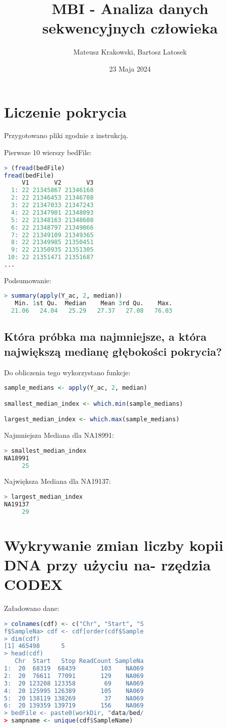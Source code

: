 \documentclass{article}
\title{MBI - Analiza danych sekwencyjnych człowieka}
\author{Mateusz Krakowski, Bartosz Latosek}
\date{23 Maja 2024}
\begin{document}
\maketitle

\section{Liczenie pokrycia}
Przygotowano pliki zgodnie z instrukcją.

Pierwsze 10 wierszy bedFile:
\begin{lstlisting}[language=R]
> (fread(bedFile)
fread(bedFile) 
     V1       V2       V3
  1: 22 21345867 21346168
  2: 22 21346453 21346708
  3: 22 21347033 21347243
  4: 22 21347901 21348093
  5: 22 21348163 21348608
  6: 22 21348797 21349066
  7: 22 21349109 21349365
  8: 22 21349985 21350451
  9: 22 21350935 21351305
 10: 22 21351471 21351687
...
\end{lstlisting}
Podsumowanie:
\begin{lstlisting}[language=R]
> summary(apply(Y_ac, 2, median))
   Min. 1st Qu.  Median    Mean 3rd Qu.    Max.
  21.06   24.04   25.29   27.37   27.08   76.03
\end{lstlisting}



\subsection{Która próbka ma najmniejsze, a która największą medianę głębokości pokrycia?}
Do obliczenia tego wykorzystano funkcje:
\begin{lstlisting}[language=R]
sample_medians <- apply(Y_ac, 2, median)

smallest_median_index <- which.min(sample_medians)

largest_median_index <- which.max(sample_medians)
\end{lstlisting}

Najmniejsza Mediana dla NA18991:
\begin{lstlisting}[language=R]
> smallest_median_index
NA18991
     25
\end{lstlisting}
Największa Mediana dla NA19137:
\begin{lstlisting}[language=R]
> largest_median_index
NA19137
     29
\end{lstlisting}

\section{Wykrywanie zmian liczby kopii DNA przy użyciu na-
rzędzia CODEX}
Załadowano dane:
\begin{lstlisting}[language=R]
> colnames(cdf) <- c("Chr", "Start", "S
f$SampleNa> cdf <- cdf[order(cdf$Sample
> dim(cdf)
[1] 465498      5
> head(cdf)
   Chr  Start   Stop ReadCount SampleNa
1:  20  68319  68439       103    NA069
2:  20  76611  77091       129    NA069
3:  20 123208 123358        69    NA069
4:  20 125995 126389       105    NA069
5:  20 138119 138269        37    NA069
6:  20 139359 139719       156    NA069
> bedFile <- paste0(workDir, "data/bed/
> sampname <- unique(cdf$SampleName)
\end{lstlisting}
\end{document}
